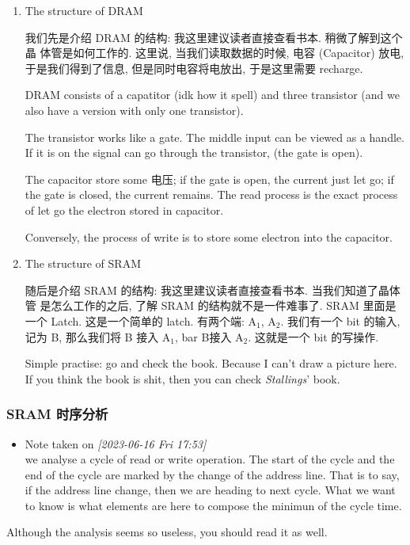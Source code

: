 \documentclass[11pt]{article}
\begin{document}
\begin{enumerate}
\item The structure of DRAM
\label{sec:org1ba703b}

我们先是介绍 DRAM 的结构: 我这里建议读者直接查看书本. 稍微了解到这个晶
体管是如何工作的. 这里说, 当我们读取数据的时候, 电容 (Capacitor) 放电,
于是我们得到了信息, 但是同时电容将电放出, 于是这里需要 recharge.

DRAM consists of a capatitor (idk how it spell) and three transistor (and we also have a version with only one transistor). 

The transistor works like a gate. The middle input can be viewed as a handle. If it is on the signal can go through the transistor, (the gate is open).

The capacitor store some 电压; if the gate is open, the current just let go; if the gate is closed, the current remains. The read process is the exact process of let go the electron stored in capacitor. 

Conversely, the process of write is to store some electron into the capacitor.

\item The structure of SRAM
\label{sec:org8a664fa}

随后是介绍 SRAM 的结构: 我这里建议读者直接查看书本. 当我们知道了晶体管
是怎么工作的之后, 了解 SRAM 的结构就不是一件难事了. SRAM 里面是一个
Latch. 这是一个简单的 latch. 有两个端: A\(_{\text{1}}\), A\(_{\text{2}}\). 我们有一个 bit 的输入,
记为 B, 那么我们将 B 接入 A\(_{\text{1}}\), bar B接入 A\(_{\text{2}}\). 这就是一个 bit 的写操作.

Simple practise: go and check the book. Because I can't draw a picture here. If you think the book is shit, then you can check \emph{Stallings}' book.
\end{enumerate}

\subsubsection{SRAM 时序分析}
\label{sec:orgc2880ca}

\begin{itemize}
\item Note taken on \textit{[2023-06-16 Fri 17:53] } \\
we analyse a cycle of read or write operation. The start of the cycle and the end of the cycle are marked by the change of the address line. That is to say, if the address line change, then we are heading to next cycle. What we want to know is what elements are here to compose the minimun of the cycle time.
\end{itemize}
Although the analysis seems so useless, you should read it as well. 
\end{document}
